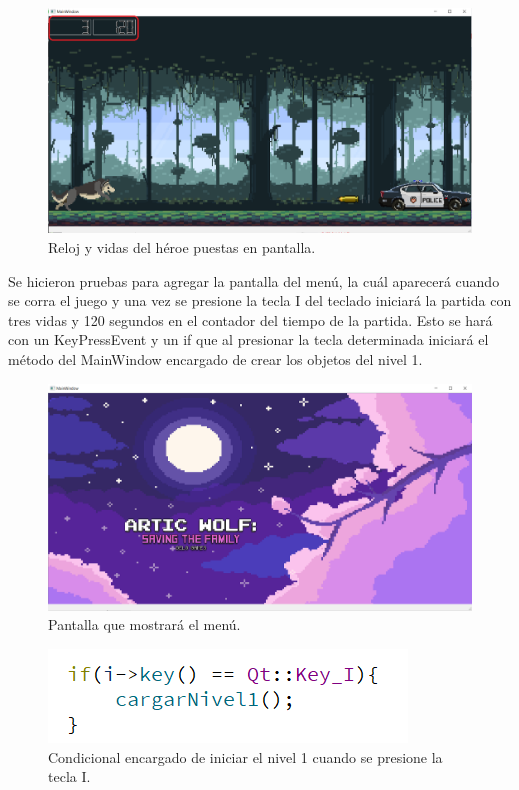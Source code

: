 \documentclass{article}
\begin{document}
\newpage
\begin{figure}[h]
\includegraphics[scale=0.4]{Images/tiempovidas.png}
\centering
\caption{Reloj y vidas del héroe puestas en pantalla.}
\label{fig:vidastiempo}
\end{figure}

Se hicieron pruebas para agregar la pantalla del menú, la cuál aparecerá cuando se corra el juego y una vez se presione la tecla I del teclado iniciará la partida con tres vidas y 120 segundos en el contador del tiempo de la partida. Esto se hará con un KeyPressEvent y un if que al presionar la tecla determinada iniciará el método del MainWindow encargado de crear los objetos del nivel 1.

\begin{figure}[h]
\includegraphics[scale=0.4]{Images/pantallainicio.png}
\centering
\caption{Pantalla que mostrará el menú.}
\label{fig:pantallamenu}
\end{figure}

\newpage
\begin{figure}[h]
\includegraphics[scale=1]{Images/keyi.png}
\centering
\caption{Condicional encargado de iniciar el nivel 1 cuando se presione la tecla I.}
\label{fig:if}
\end{figure}
\end{document}
